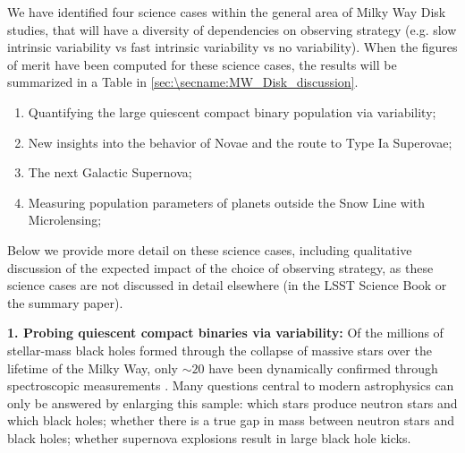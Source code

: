 We have identified four science cases within the general area of Milky
Way Disk studies, that will have a diversity of dependencies on
observing strategy (e.g. slow intrinsic variability vs fast intrinsic
variability vs no variability). When the figures of merit have been
computed for these science cases, the results will be summarized in a
Table in \autoref{sec:\secname:MW_Disk_discussion}.

\begin{enumerate}
  \item Quantifying the large quiescent compact binary population via variability;
  \item New insights into the behavior of Novae and the route to Type Ia Superovae;
  \item The next Galactic Supernova;
  \item Measuring population parameters of planets outside the Snow Line with Microlensing;
\end{enumerate}

Below we provide more detail on these science cases, including
qualitative discussion of the expected impact of the choice of observing
strategy, as these science cases are not discussed in detail elsewhere
(in the LSST Science Book or the \citet{IvezicEtal2008} summary paper).

{\bf 1. Probing quiescent compact binaries via variability:} Of the
millions of stellar-mass black holes formed through the collapse of
massive stars over the lifetime of the Milky Way, only $\sim 20$ have
been dynamically confirmed through spectroscopic measurements
\citep[e.g.,][]{2015arXiv151008869C}.  Many questions central to modern
astrophysics can only be answered by enlarging this sample: which
stars produce neutron stars and which black holes; whether there is a
true gap in mass between neutron stars and black holes; whether
supernova explosions result in large black hole kicks.

